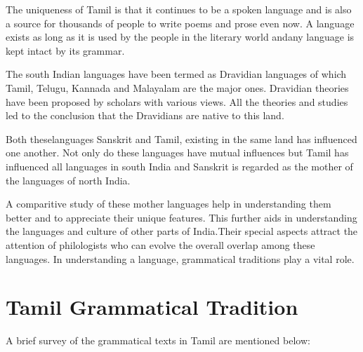 The uniqueness of Tamil is that it continues to be a spoken language and is also a source for thousands of people to write poems and prose even now. A language exists as long as it is used by the people in the literary world andany language is kept intact by its grammar.

The south Indian languages have been termed as Dravidian languages of which Tamil, Telugu, Kannada and Malayalam are the major ones. Dravidian theories have been proposed by scholars with various views. All the theories and studies led to the conclusion that the Dravidians are native to this land.

Both theselanguages Sanskrit and Tamil, existing in the same land has influenced one another. Not only do these languages have mutual influences but Tamil has influenced all languages in south India and Sanskrit is regarded as the mother of the languages of north India.

A comparitive study of these mother languages help in understanding them better and to appreciate their unique features. This further aids in understanding the languages and culture of other parts of India.Their special aspects attract the attention of philologists who can evolve the overall overlap among these languages. In understanding a language, grammatical traditions play a vital role.


\section*{Tamil Grammatical Tradition}

A brief survey of the grammatical texts in Tamil are mentioned below:

